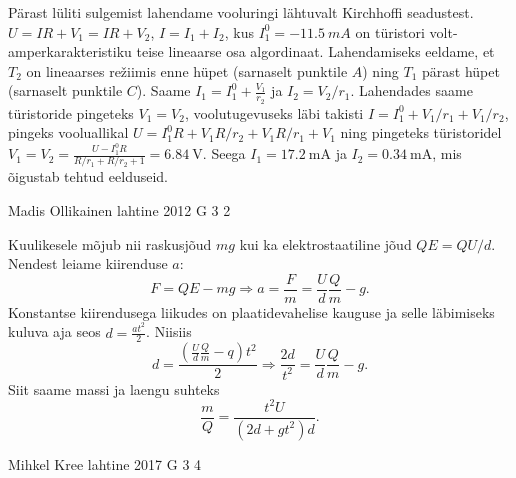 \documentclass[11pt, twoside]{article}
\begin{document}
{{\begin{figure}[h]
\begin{center}
\end{center}
\end{figure}
Pärast lüliti sulgemist lahendame vooluringi lähtuvalt Kirchhoffi seadustest. $U = IR + V_1 = IR + V_2$, $I = I_1 + I_2$, kus $I_1^0=\SI{-11.5}{mA}$  on türistori volt-amperkarakteristiku teise lineaarse osa algordinaat.
Lahendamiseks eeldame, et $T_2$ on lineaarses režiimis enne hüpet (sarnaselt punktile $A$) ning $T_1$ pärast hüpet (sarnaselt punktile $C$). Saame $I_1 = I_1^0 + \frac{V_1}{r_2}$ ja $I_2 = V_2/r_1$. Lahendades saame türistoride pingeteks $V_1 = V_2$, voolutugevuseks läbi takisti $I = I_1^0 + V_1/r_1 + V_1/r_2$, pingeks vooluallikal $U = I_1^0R + V_1R/r_2 + V_1R/r_1 + V_1$ ning pingeteks türistoridel $V_1 = V_2 = \frac{U - I_1^0R}{R/r_1 + R/r_2 + 1} = \SI{6.84}{\volt}$. Seega $I_1 = \SI{17.2}{\milli\ampere}$ ja $I_2 = \SI{0.34}{\milli\ampere}$, mis õigustab tehtud eelduseid. 
\fi
}

{Madis Ollikainen} %
{lahtine} %
{2012} %
{G 3} %
{2} %
{

\ifSolution
Kuulikesele mõjub nii raskusjõud $mg$ kui ka elektrostaatiline jõud $QE=QU/d$. Nendest leiame kiirenduse $a$:
\[ F = QE - mg \Rightarrow a = \frac{F}{m} = \frac{U}{d}\frac{Q}{m} - g. \]
Konstantse kiirendusega liikudes on plaatidevahelise kauguse ja selle läbimiseks kuluva aja seos $ d = \frac{at^2}{2} $. Niisiis
\[ d = \frac{\left(\frac{U}{d}\frac{Q}{m} - q\right)t^2}{2} \Rightarrow \frac{2d}{t^2} = \frac{U}{d}\frac{Q}{m} - g. \]
Siit saame massi ja laengu suhteks
\[ \frac{m}{Q} = \frac{t^2U}{\left(2d + gt^2\right)d}.  \]
\fi
}

{Mihkel Kree} %
{lahtine} %
{2017} %
{G 3} %
{4} %
{

}}
\end{document}
